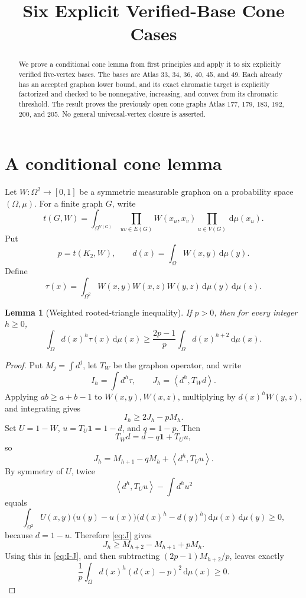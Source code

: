 \documentclass[11pt]{article}
\title{Six Explicit Verified-Base Cone Cases}
\author{}
\date{}
\newtheorem{lemma}[theorem]{Lemma}
\newcommand{\dd}{\,\mathrm{d}}
\newcommand{\one}{\mathbf{1}}
\newcommand{\ip}[2]{\left\langle #1,#2\right\rangle}
\begin{document}
\maketitle

\begin{abstract}
We prove a conditional cone lemma from first principles and apply it to
six explicitly verified five-vertex bases.  The bases are Atlas 33, 34,
36, 40, 45, and 49.  Each already has an accepted graphon lower bound,
and its exact chromatic target is explicitly factorized and checked to
be nonnegative, increasing, and convex from its chromatic threshold.
The result proves the previously open cone graphs Atlas 177, 179, 183,
192, 200, and 205.  No general universal-vertex closure is asserted.
\end{abstract}


\section{A conditional cone lemma}

Let $W\colon\Omega^2\to[0,1]$ be a symmetric measurable graphon on a
probability space $(\Omega,\mu)$.  For a finite graph $G$, write
\[
t(G,W)=
\int_{\Omega^{V(G)}}
\prod_{uv\in E(G)}W(x_u,x_v)
\prod_{u\in V(G)}\dd\mu(x_u).
\]
Put
\[
p=t(K_2,W),
\qquad
d(x)=\int_\Omega W(x,y)\dd\mu(y).
\]
Define
\[
\tau(x)=
\int_{\Omega^2}W(x,y)W(x,z)W(y,z)
\dd\mu(y)\dd\mu(z).
\]

\begin{lemma}[Weighted rooted-triangle inequality]
\label{lem:weighted}
If $p>0$, then for every integer $h\geq0$,
\[
\int_\Omega d(x)^h\tau(x)\dd\mu(x)
\geq
\frac{2p-1}{p}
\int_\Omega d(x)^{h+2}\dd\mu(x).
\]
\end{lemma}

\begin{proof}
Put $M_j=\int d^j$, let $T_W$ be the graphon operator, and write
\[
I_h=\int d^h\tau,
\qquad
J_h=\ip{d^h}{T_Wd}.
\]
Applying $ab\geq a+b-1$ to $W(x,y),W(x,z)$, multiplying by
$d(x)^hW(y,z)$, and integrating gives
\begin{equation}
I_h\geq2J_h-pM_h.
\label{eq:I-J}
\end{equation}
Set $U=1-W$, $u=T_U\one=1-d$, and $q=1-p$.  Then
\[
T_Wd=d-q\one+T_Uu,
\]
so
\begin{equation}
J_h=M_{h+1}-qM_h+\ip{d^h}{T_Uu}.
\label{eq:J}
\end{equation}
By symmetry of $U$, twice
\[
\ip{d^h}{T_Uu}-\int d^hu^2
\]
equals
\[
\int_{\Omega^2}U(x,y)
\bigl(u(y)-u(x)\bigr)
\bigl(d(x)^h-d(y)^h\bigr)
\dd\mu(x)\dd\mu(y)\geq0,
\]
because $d=1-u$.  Therefore \eqref{eq:J} gives
\[
J_h\geq M_{h+2}-M_{h+1}+pM_h.
\]
Using this in \eqref{eq:I-J}, and then subtracting
$(2p-1)M_{h+2}/p$, leaves exactly
\[
\frac1p\int_\Omega d(x)^h(d(x)-p)^2\dd\mu(x)\geq0.
\]
\end{proof}
\end{document}

